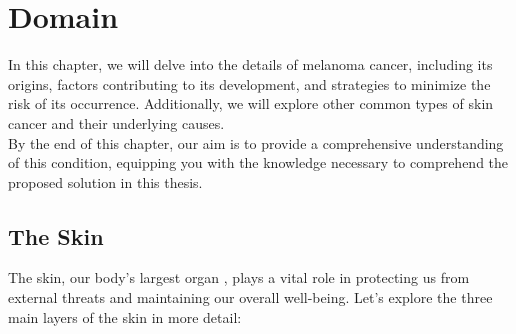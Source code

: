 \chapter{Domain}
\label{cap:problem_domain}

In this chapter, we will delve into the details of melanoma cancer, including its origins,
factors contributing to its development, and strategies to minimize the risk of its occurrence.
Additionally, we will explore other common types of skin cancer and their underlying causes. \\

By the end of this chapter, our aim is to provide a comprehensive understanding of this condition,
equipping you with the knowledge necessary to comprehend the proposed solution in this thesis.

\section{The Skin}

The skin, our body's largest organ \cite{BaseCancerKnowledge}, plays a vital role in protecting us from external threats and maintaining our overall well-being. Let's explore the three main layers of the skin in more detail:

